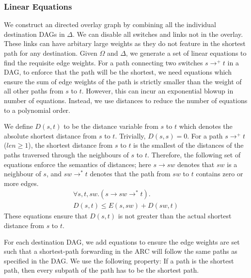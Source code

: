 \subsubsection{Linear Equations} \label{sec:linearequations}
We construct an directed overlay graph
by combining all the individual destination DAGs in $\Delta$.
We can disable all switches and links not in the overlay. 
These links can have arbitary large weights as they do not
feature in the shortest path for any destination. 
Given $\Omega$ and $\Delta$, we generate a set of linear equations
to find the requisite edge weights. For a path connecting two switches 
$s \rightarrow^+ t$ in a DAG, 
to enforce that the path will be the shortest, we need equations
which ensure the sum of edge weights of the path is strictly smaller than
the weight of all other paths from $s$ to $t$. However, this can incur
an exponential blowup in number of equations. Instead, we use distances 
to reduce the number of equations to a polynomial order. 

We define $D(s,t)$ to be the distance variable from $s$ to $t$
which denotes the absolute shortest distance from $s$ to $t$. 
Trivially, $D(s,s) = 0$. For a path $s \rightarrow^+ t$ ($len \geq 1$),
the shortest distance from $s$ to $t$ is the smallest of the distances
of the paths traversed through the neighbours of $s$ to $t$. Therefore, the
following set of equations enforce the semantics of distances; 
here $s \rightarrow sw$ denotes that $sw$ is a neighbour
of $s$, and $sw \rightarrow^* t$ denotes that the path from $sw$ to $t$ contains
zero or more edges.
\begin{multline} \label{eq:dist}
\forall s, t, sw. (s \rightarrow sw \rightarrow^* t).\\
D(s, t) \leq E(s, sw) + D(sw, t)
\end{multline}
These equations ensure that $D(s,t)$ is not greater than 
the actual shortest distance from $s$ to $t$.

For each destination DAG, we add equations to ensure the 
edge weights are set such that a shortest-path forwarding in the ARC will 
follow the same paths as specified in the DAG. We use the following
property: If a path is the shortest 
path, then every subpath of the path has to be the shortest path.

